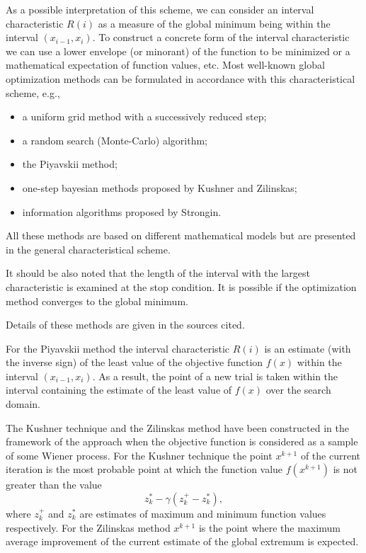 \documentclass{svproc}
\begin{document}
As a possible interpretation of this scheme, we can consider an interval characteristic $R(i)$ as a measure of the global minimum being within the interval
$(x_{i-1},x_i)$.
To construct a concrete form of the interval characteristic we can use a lower envelope (or minorant) of the function to be minimized or a mathematical expectation of function values, etc. 
Most well-known global optimization methods can be formulated in accordance with this characteristical scheme, e.g.,
\begin{itemize}
\item a uniform grid method with a successively reduced step;
\item a random search (Monte-Carlo) algorithm;
\item the Piyavskii method;
\item one-step bayesian methods proposed by Kushner and Zilinskas;
\item information algorithms proposed by Strongin.
\end{itemize}
All these methods are based on different mathematical models but are presented in the general characteristical scheme.

It should be also noted that the length of the interval with the largest characteristic is examined at the stop condition.
It is possible if the optimization method converges to the global minimum.

Details of these methods are given in the sources cited. %

For the Piyavskii method the interval characteristic $R(i)$ is an estimate (with the inverse sign) of the least value of the objective function $f(x)$ within the
interval $(x_{i-1},x_i)$. As a result, the point of a new trial is taken within the interval containing the estimate of the least value of $f(x)$ over the search domain.

The Kushner technique and the Zilinskas method have been constructed in the framework of the approach when the objective function is considered as
a sample of some Wiener process. For the Kushner technique the point $x^{k+1}$ of the current iteration is the most probable point at which the function value
$f(x^{k+1})$ is not greater than the value
\[
z_k^* -\gamma (z_k^+-z_k^*),
\]
where $z_k^+$ and $z_k^*$ are estimates of maximum and minimum function values respectively. For the Zilinskas method $x^{k+1}$ is the point where the maximum average improvement of the current estimate of the global extremum is expected.
\end{document}
